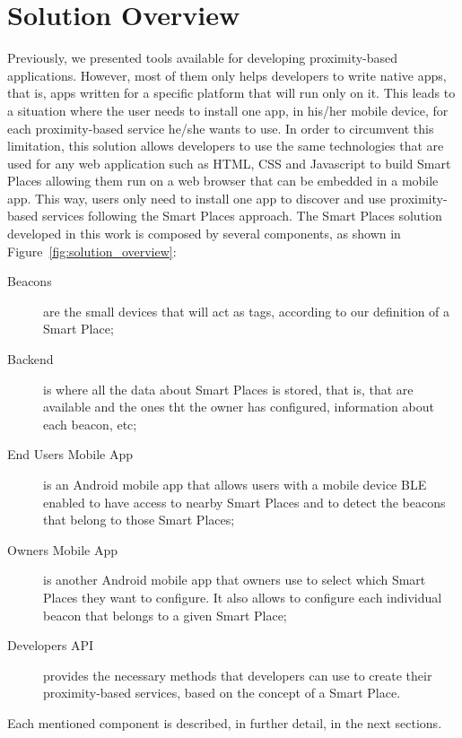 \section{Solution Overview}
\label{sec:solution_solution_overview}
Previously, we presented tools available for developing proximity-based applications.
However, most of them only helps developers to write native apps, that is, apps written for a specific platform that will run only on it.
This leads to a situation where the user needs to install one app, in his/her mobile device, for each proximity-based service he/she wants to use.
In order to circumvent this limitation, this solution allows developers
to use the same technologies that are used for any web application such as \gls{HTML}, \gls{CSS} and Javascript to build Smart Places allowing them run on a web browser that can be embedded in a mobile app. This way, users only need to install one app to discover and use proximity-based services following the Smart Places approach.
The Smart Places solution developed in this work is composed by several components, as shown in Figure~\ref{fig:solution_overview}:
\begin{description}
  \item[Beacons]
  are the small devices that will act as tags, according to our definition of a Smart Place;
  \item[Backend]
  is where all the data about Smart Places is stored, that is, that are available and the ones tht the owner has configured, information about each beacon, etc;
  \item[End Users Mobile App]
  is an Android mobile app that allows users with a mobile device \gls{BLE} enabled to have access to nearby Smart Places and to detect the beacons that belong to those Smart Places;
  \item[Owners Mobile App] is another Android mobile app that owners use to select which Smart Places they want to configure. It also allows to configure each individual beacon that belongs to a given Smart Place;
  \item[Developers \gls{API}] provides the necessary methods that developers can use to create their proximity-based services, based on the concept of a Smart Place.
\end{description}
Each mentioned component is described, in further detail, in the next sections.

